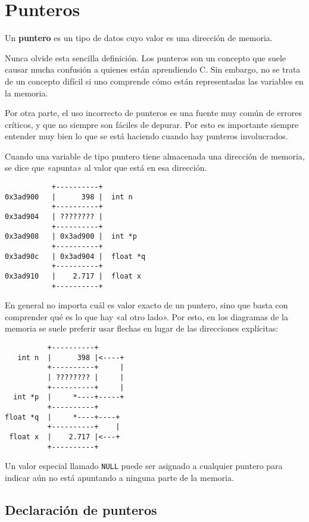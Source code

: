 \chapter{Punteros}

Un \textbf{puntero} es un tipo de datos cuyo valor es una dirección de
memoria.

Nunca olvide esta sencilla definición. Los punteros son un concepto que
suele causar mucha confusión a quienes están aprendiendo C. Sin embargo,
no se trata de un concepto difícil si uno comprende cómo están
representadas las variables en la memoria.

Por otra parte, el uso incorrecto de punteros es una fuente muy común de
errores críticos, y que no siempre son fáciles de depurar. Por esto es
importante siempre entender muy bien lo que se está haciendo cuando hay
punteros involucrados.

Cuando una variable de tipo puntero tiene almacenada una dirección de
memoria, se dice que «apunta» al valor que está en esa dirección.

\begin{verbatim}
           +----------+
0x3ad900   |      398 |  int n
           +----------+
0x3ad904   | ???????? |
           +----------+
0x3ad908   | 0x3ad900 |  int *p
           +----------+
0x3ad90c   | 0x3ad904 |  float *q
           +----------+
0x3ad910   |    2.717 |  float x
           +----------+
\end{verbatim}

En general no importa cuál es valor exacto de un puntero, sino que basta
con comprender qué es lo que hay «al otro lado». Por esto, en los
diagramas de la memoria se suele preferir usar flechas en lugar de las
direcciones explícitas:

\begin{verbatim}
          +----------+
   int n  |      398 |<----+
          +----------+     |
          | ???????? |     |
          +----------+     |
  int *p  |     *----+-----+
          +----------+
float *q  |     *----+----+
          +----------+    |
 float x  |    2.717 |<---+
          +----------+
\end{verbatim}

Un valor especial llamado \lstinline!NULL! puede ser asignado a
cualquier puntero para indicar aún no está apuntando a ninguna parte de
la memoria.

\section{Declaración de punteros}

